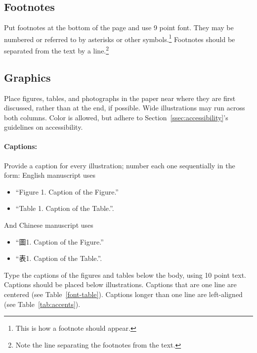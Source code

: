 \documentclass[11pt,a4paper]{article}
\begin{document}
\subsection{Footnotes}
Put footnotes at the bottom of the page and use 9 point font.
They may be numbered or referred to by asterisks or other symbols.\footnote{This is how a footnote should appear.}
Footnotes should be separated from the text by a line.\footnote{Note the line separating the footnotes from the text.}

\subsection{Graphics}
\label{ssec:graphics}

Place figures, tables, and photographs in the paper near where they are first discussed, rather than at the end, if possible.
Wide illustrations may run across both columns.
Color is allowed, but adhere to Section~\ref{ssec:accessibility}'s guidelines on accessibility.

\paragraph{Captions:}
Provide a caption for every illustration; number each one sequentially in the form: English manuscript uses
\begin{itemize}
\item ``Figure 1. Caption of the Figure.''
\item ``Table 1. Caption of the Table.''.
\end{itemize}

\noindent And Chinese manuscript uses
\begin{itemize}
\item ``圖1. Caption of the Figure.''
\item ``表1. Caption of the Table.''.
\end{itemize}


Type the captions of the figures and tables below the body, using 10 point text.
Captions should be placed below illustrations.
Captions that are one line are centered (see Table~\ref{font-table}).
Captions longer than one line are left-aligned (see Table~\ref{tab:accents}).
\end{document}
